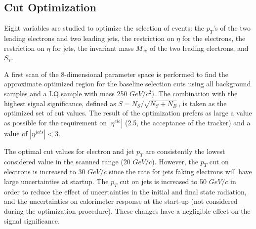 \documentclass{cmspaper}
\begin{document}
\begin{linenumbers}
\begin{table}[htbp]
\begin{center}
\end{center}
\caption{\small \sl Number events expected from LQ signal and background samples after the analysis selection for 100 pb$^{-1}$ of data.
The cut value on the kinematic variable $S_T$ depends on the LQ mass, and it is indicated in the second column.
Data samples from FullSim Monte Carlo are used for all backgrounds and for LQ masses of 250 and 400 $GeV/c^2$. 
Signal samples marked by (*) are made with the FastSim Monte Carlo. } 
\label{tab:EventSelSummary}
\end{table}

\subsection{Cut Optimization} \label{sec:cutOptimization}

Eight variables are studied to optimize the selection of  events:
 the $p_T$'s of the two leading electrons and two leading jets, the 
restriction 
on $\eta$ for the electrons, the restriction on 
$\eta$ for jets, the invariant mass $M_{ee}$ of the two leading electrons, 
and  $S_T$.


A first scan of the 8-dimensional parameter space is performed to find the 
approximate optimized region for the baseline selection cuts using all background samples
and a LQ sample with mass 250 $GeV/c^2)$.
The combination with the highest signal significance, 
defined as $S = N_S/\sqrt{N_S+N_B}$, is taken as the optimized set of cut values.
The result of the optimization prefers as large a value as possible for
the requirement on $|\eta^{ele}|$ (2.5, the acceptance of the tracker)
and a value of $|\eta^{jets}|<3$. 

The optimal cut values for electron and jet $p_T$ are consistently 
the lowest considered value in the scanned range 
(20 $GeV/c$). However, the $p_{T}$ cut on electrons is increased to 
30 $GeV/c$ since the rate for jets faking electrons will have
large uncertainties at startup.%
The $p_{T}$ cut on jets is increased to 50 $GeV/c$ in order to reduce the effect 
of uncertainties in the initial and final state radiation, and the uncertainties 
on calorimeter response at the start-up (not considered during the
optimization procedure).
These changes have a negligible effect on the signal significance. 


\end{linenumbers}
\end{document}
